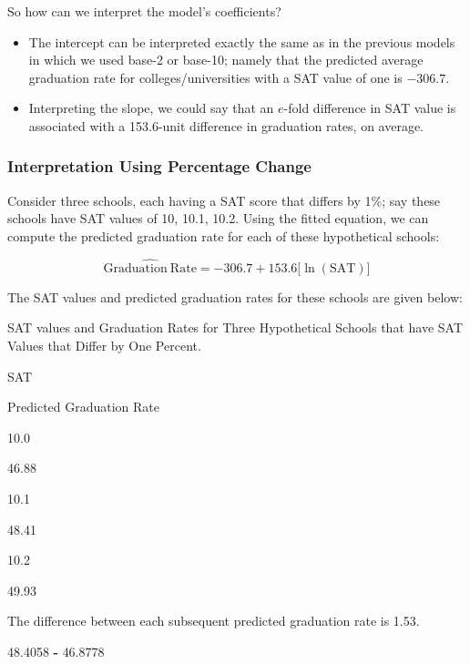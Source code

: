 \documentclass[]{book}
\newenvironment{Shaded}{\begin{snugshade}}{\end{snugshade}}
\newcommand{\FloatTok}[1]{\textcolor[rgb]{0.00,0.00,0.81}{#1}}
\newcommand{\OperatorTok}[1]{\textcolor[rgb]{0.81,0.36,0.00}{\textbf{#1}}}
\newcommand{\StringTok}[1]{\textcolor[rgb]{0.31,0.60,0.02}{#1}}
\providecommand{\tightlist}{%
  \setlength{\itemsep}{0pt}\setlength{\parskip}{0pt}}
\begin{document}
So how can we interpret the model's coefficients?

\begin{itemize}
\tightlist
\item
  The intercept can be interpreted exactly the same as in the previous models in which we used base-2 or base-10; namely that the predicted average graduation rate for colleges/universities with a SAT value of one is \(-306.7\).
\item
  Interpreting the slope, we could say that an \(e\)-fold difference in SAT value is associated with a 153.6-unit difference in graduation rates, on average.
\end{itemize}

\hypertarget{interpretation-using-percentage-change}{%
\subsubsection{Interpretation Using Percentage Change}\label{interpretation-using-percentage-change}}

Consider three schools, each having a SAT score that differs by 1\%; say these schools have SAT values of 10, 10.1, 10.2. Using the fitted equation, we can compute the predicted graduation rate for each of these hypothetical schools:

\[
\hat{\mathrm{Graduation~Rate}} = -306.7 + 153.6 \bigg[\ln (\mathrm{SAT})\bigg]
\]

The SAT values and predicted graduation rates for these schools are given below:

\label{tab:unnamed-chunk-51}SAT values and Graduation Rates for Three Hypothetical Schools that have SAT Values that Differ by One Percent.

SAT

Predicted Graduation Rate

10.0

46.88

10.1

48.41

10.2

49.93

The difference between each subsequent predicted graduation rate is 1.53.

\begin{Shaded}
\begin{Highlighting}[]
\FloatTok{48.4058} \OperatorTok{-}\StringTok{ }\FloatTok{46.8778}
\end{Highlighting}
\end{Shaded}
\end{document}
